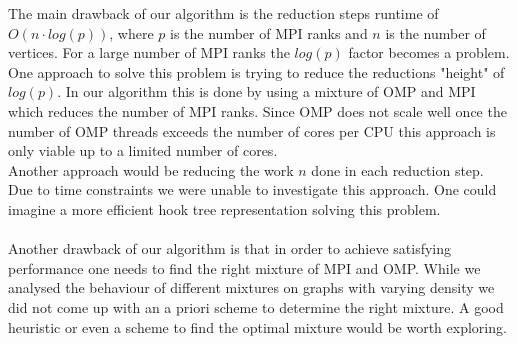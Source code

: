 The main drawback of our algorithm is the reduction steps runtime of $O\left(n \cdot log\left(p\right)\right)$, where $p$ is the number of MPI ranks and $n$ is the number of vertices. For a large number of MPI ranks the $log\left(p\right)$ factor becomes a problem.\\
One approach to solve this problem is trying to reduce the reductions "height" of $log\left(p\right)$. In our algorithm this is done by using a mixture of OMP and MPI which reduces the number of MPI ranks. Since OMP does not scale well once the number of OMP threads exceeds the number of cores per CPU this approach is only viable up to a limited number of cores.\\
Another approach would be reducing the work $n$ done in each reduction step. Due to time constraints we were unable to investigate this approach. One could imagine a more efficient hook tree representation solving this problem.\\
\\
Another drawback of our algorithm is that in order to achieve satisfying performance one needs to find the right mixture of MPI and OMP. While we analysed the behaviour of different mixtures on graphs with varying density we did not come up with an a priori scheme to determine the right mixture. A good heuristic or even a scheme to find the optimal mixture would be worth exploring.